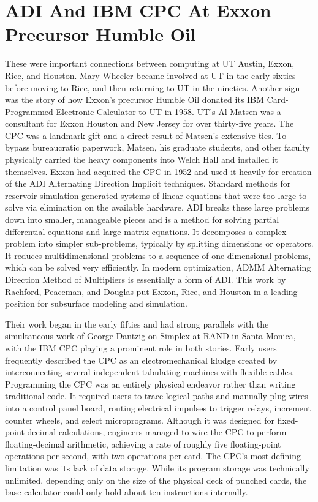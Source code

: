 \section{ADI And IBM CPC At Exxon Precursor Humble Oil}

These were important connections between computing at UT Austin, Exxon, Rice, and Houston. Mary Wheeler became involved at UT in the early sixties before moving to Rice, and then returning to UT in the nineties. Another sign was the story of how Exxon’s precursor Humble Oil donated its IBM Card-Programmed Electronic Calculator to UT in 1958. UT’s Al Matsen was a consultant for Exxon Houston and New Jersey for over thirty-five years. The CPC was a landmark gift and a direct result of Matsen’s extensive ties. To bypass bureaucratic paperwork, Matsen, his graduate students, and other faculty physically carried the heavy components into Welch Hall and installed it themselves. Exxon had acquired the CPC in 1952 and used it heavily for creation of the ADI Alternating Direction Implicit techniques. Standard methods for reservoir simulation generated systems of linear equations that were too large to solve via elimination on the available hardware. ADI breaks these large problems down into smaller, manageable pieces and is a method for solving partial differential equations and large matrix equations. It decomposes a complex problem into simpler sub-problems, typically by splitting dimensions or operators. It reduces multidimensional problems to a sequence of one-dimensional problems, which can be solved very efficiently. In modern optimization, ADMM Alternating Direction Method of Multipliers is essentially a form of ADI. This work by Rachford, Peaceman, and Douglas put Exxon, Rice, and Houston in a leading position for subsurface modeling and simulation.

Their work began in the early fifties and had strong parallels with the simultaneous work of George Dantzig on Simplex at RAND in Santa Monica, with the IBM CPC playing a prominent role in both stories. Early users frequently described the CPC as an electromechanical kludge created by interconnecting several independent tabulating machines with flexible cables. Programming the CPC was an entirely physical endeavor rather than writing traditional code. It required users to trace logical paths and manually plug wires into a control panel board, routing electrical impulses to trigger relays, increment counter wheels, and select microprograms. Although it was designed for fixed-point decimal calculations, engineers managed to wire the CPC to perform floating-decimal arithmetic, achieving a rate of roughly five floating-point operations per second, with two operations per card. The CPC's most defining limitation was its lack of data storage. While its program storage was technically unlimited, depending only on the size of the physical deck of punched cards, the base calculator could only hold about ten instructions internally. 

